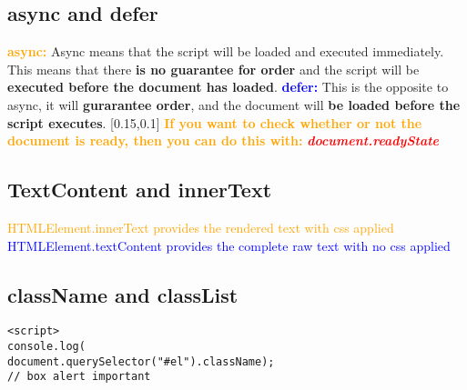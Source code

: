 \documentclass[main.tex,fontsize=6pt,paper=a4,paper=landscape,DIV=calc,]{scrartcl}
\begin{document}
\begin{multicols*}{4}
\subsection{async and defer}  
\textcolor{orange}{\textbf{async:}}\newline
Async means that the script will be loaded and executed immediately.\newline
This means that there \textbf{is no guarantee for order} and the script will be \textbf{executed before the document has loaded}.\newline
\textcolor{blue}{\textbf{defer:}}\newline
This is the opposite to async, it will \textbf{gurarantee order}, \newline
and the document will \textbf{be loaded before the script executes}.
[0.15,0.1]
\textcolor{orange}{\textbf{If you want to check whether or not the document is ready, \newline
then you can do this with: }}\textcolor{red}{\textbf{\emph{document.readyState}}}


\subsection{TextContent and innerText}  
\textcolor{orange}{HTMLElement.innerText provides the rendered text with css applied}\newline
\textcolor{blue}{HTMLElement.textContent provides the complete raw text with no css applied}
 
\subsection{className and classList}  
\vspace{-2mm}
\begin{lstlisting}
<script>
console.log(
document.querySelector("#el").className);
// box alert important


\end{lstlisting}
\end{multicols*}
\end{document}
